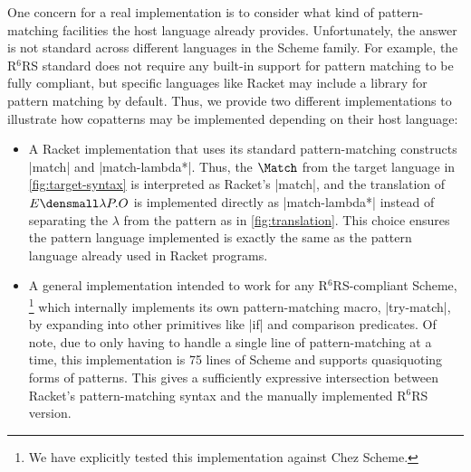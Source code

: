 One concern for a real implementation is to consider what kind of pattern-matching facilities the host language already provides.
Unfortunately, the answer is not standard across different languages in the Scheme family.
For example, the R${}^6$RS standard does not require any built-in support for pattern matching to be fully compliant, but specific languages like Racket may include a library for pattern matching by default.
Thus, we provide two different implementations to illustrate how copatterns may be implemented depending on their host language:
\begin{itemize}
\item
  A Racket implementation that uses its standard pattern-matching constructs \rkt|match| and \rkt|match-lambda*|.
  Thus, the $\Match$  from the target language in \cref{fig:target-syntax} is interpreted as Racket's \rkt|match|, and the translation of $E\den{\lambda P. O}$ is implemented directly as \rkt|match-lambda*| instead of separating the $\lambda$ from the pattern as in \cref{fig:translation}.
  This choice ensures the pattern language implemented is exactly the same as the pattern language already used in Racket programs.
\item
  A general implementation intended to work for any R${}^6$RS-compliant Scheme,%
  \footnote{We have explicitly tested this implementation against Chez Scheme.}
  which internally implements its own pattern-matching macro, \scm|try-match|, by expanding into other primitives like \scm|if| and comparison predicates.
  Of note, due to only having to handle a single line of pattern-matching at a time, this implementation is 75 lines of Scheme and supports quasiquoting forms of patterns.
  This gives a sufficiently expressive intersection between Racket's pattern-matching syntax and the manually implemented R${}^6$RS version.
\end{itemize}


